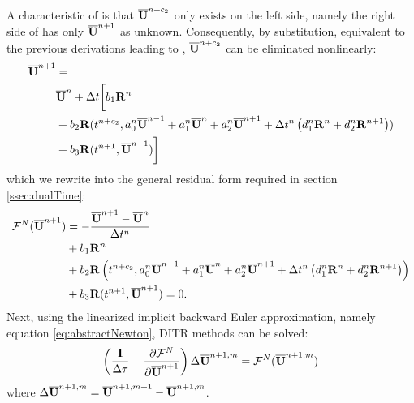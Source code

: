 A characteristic of  is that
$\overline{\mathbf{U}}^{n+c_2}$ only exists on the left side, namely the
right side of  has only $\overline{\mathbf{U}}^{n+1}$ as
unknown. Consequently, by substitution, equivalent
to the previous derivations leading to ,
$\overline{\mathbf{U}}^{n+c_2}$ can be eliminated nonlinearly:
\begin{equation}
    \begin{aligned}
        \overline{\mathbf{U}}^{n+1} & =                       \\
                  & \overline{\mathbf{U}}^{n} + {\Delta} t\biggl[
        b_1 \mathbf{R}^n                            \\
                  & +
            b_2 \mathbf{R}(t^{n+c_2},a^n_0\overline{\mathbf{U}}^{n - 1} +
            a^n_1\overline{\mathbf{U}}^{n} +
            a^n_2\overline{\mathbf{U}}^{n + 1}
            +
            {\Delta} t^n
            \left(
            d^n_1\mathbf{R}^{n} +
            d^n_2\mathbf{R}^{n + 1}
        \right))                            \\
                  & +
            b_3 \mathbf{R}(t^{n+1},\overline{\mathbf{U}}^{n+1})
            \biggr]
        \label{eq:nestedDITR}
    \end{aligned}
\end{equation}
which we rewrite into the general residual form required in section \ref{ssec:dualTime}:
\begin{equation}
    \begin{aligned}
        \mathcal{F}^N(\overline{\mathbf{U}}^{n+1}) & = -\frac{\overline{\mathbf{U}}^{n+1} - \overline{\mathbf{U}}^{n}}{{\Delta} t^n} \\
                         & +
        b_1 \mathbf{R}^n                                                   \\
                         & +
        b_2 \mathbf{R}\left(t^{n+c_2},a^n_0\overline{\mathbf{U}}^{n - 1} +
        a^n_1\overline{\mathbf{U}}^{n} +
        a^n_2\overline{\mathbf{U}}^{n + 1}
        +
        {\Delta} t^n
        \left(
        d^n_1\mathbf{R}^{n} +
        d^n_2\mathbf{R}^{n + 1}
        \right)\right)                                             \\
                         & +
        b_3 \mathbf{R}(t^{n+1},\overline{\mathbf{U}}^{n+1}) = 0.
        \label{eq:nestedDITR_F}
    \end{aligned}
\end{equation}
Next, using the linearized implicit backward Euler approximation,
namely equation \eqref{eq:abstractNewton}, DITR methods can be solved:
\begin{equation}
    \left(\frac{\eye}{\inc\tau} -
    \partialderivative{\FF^N}{\uu^{n+1}}  \right)
    \inc\uu^{n+1,m} = \FF^N(\uu^{n+1,m})
    \label{eq:abstractNewtonNested}
\end{equation}
where ${\Delta}\overline{\mathbf{U}}^{n+1,m}=\overline{\mathbf{U}}^{n+1,m+1}-\overline{\mathbf{U}}^{n+1,m}$.

